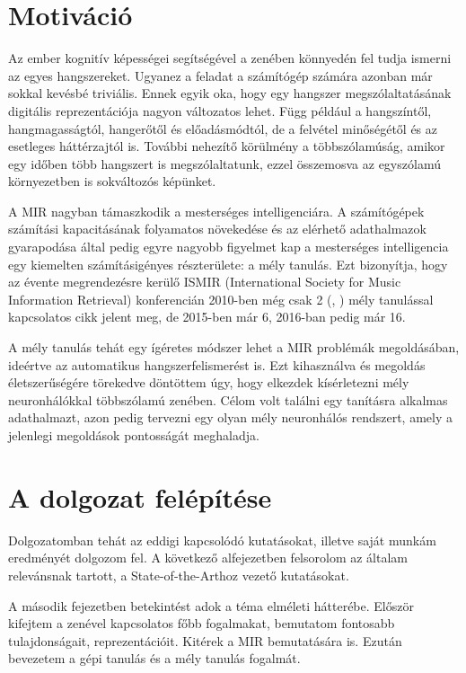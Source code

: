 \section{Motiváció}

Az ember kognitív képességei segítségével a zenében könnyedén fel tudja ismerni az egyes hangszereket. Ugyanez a feladat a számítógép számára azonban már sokkal kevésbé triviális. Ennek egyik oka, hogy egy hangszer megszólaltatásának digitális reprezentációja nagyon változatos lehet. Függ például a hangszíntől, hangmagasságtól, hangerőtől és előadásmódtól, de a felvétel minőségétől és az esetleges háttérzajtól is. További nehezítő körülmény a többszólamúság, amikor egy időben több hangszert is megszólaltatunk, ezzel összemosva az egyszólamú környezetben is sokváltozós képünket.

A MIR nagyban támaszkodik a mesterséges intelligenciára. A számítógépek számítási kapacitásának folyamatos növekedése és az elérhető adathalmazok gyarapodása által pedig egyre nagyobb figyelmet kap a mesterséges intelligencia egy kiemelten számításigényes részterülete: a mély tanulás. Ezt bizonyítja, hogy az évente megrendezésre kerülő ISMIR (International Society for Music Information Retrieval) konferencián 2010-ben még csak 2 (\cite{florian2010}, \cite{Hamel2010}) mély tanulással kapcsolatos cikk jelent meg, de 2015-ben már 6, 2016-ban pedig már 16. \cite{choi2017tutorial}

A mély tanulás tehát egy ígéretes módszer lehet a MIR problémák megoldásában, ideértve az automatikus hangszerfelismerést is. Ezt kihasználva és megoldás életszerűségére törekedve döntöttem úgy, hogy elkezdek kísérletezni mély neuronhálókkal többszólamú zenében. Célom volt találni egy tanításra alkalmas adathalmazt, azon pedig tervezni egy olyan mély neuronhálós rendszert, amely a jelenlegi megoldások pontosságát meghaladja.


\section{A dolgozat felépítése}

Dolgozatomban tehát az eddigi kapcsolódó kutatásokat, illetve saját munkám eredményét dolgozom fel. A következő alfejezetben felsorolom az általam relevánsnak tartott, a State-of-the-Arthoz vezető kutatásokat. 

A második fejezetben betekintést adok a téma elméleti hátterébe. Először kifejtem a zenével kapcsolatos főbb fogalmakat, bemutatom fontosabb tulajdonságait, reprezentációit. Kitérek a MIR bemutatására is. Ezután bevezetem a gépi tanulás és a mély tanulás fogalmát. 

